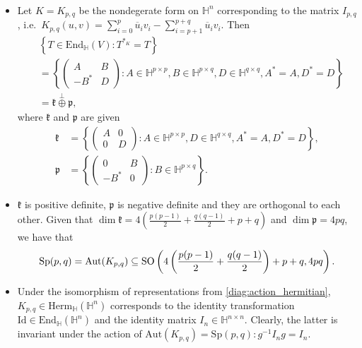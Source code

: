 \documentclass{report}
\begin{document}
\begin{itemize}
\[\begin{tikzcd}
    \end{tikzcd}
    \]
    \item Let $K = K_{p,q}$ be the nondegerate form on $\mathbb H^n$ corresponding to the matrix $I_{p,q}$, i.e.\ $K_{p,q}(u,v) = \sum_{i = 0}^p \overline u_i v_i - \sum_{i = p+1}^{p+q} \overline u_i v_i$.
    Then
    \begin{align*}
        &\left\{ T \in \mathrm{End}_\mathbb H(V) : T^{*_K} = T \right\} \\
        &= \left\{
        \begin{pmatrix}
            A & B \\
            -B^* & D
        \end{pmatrix} : A \in \mathbb H^{p \times p}, B \in \mathbb H^{p \times q}, D \in \mathbb H^{q \times q}, A^* = A, D^* = D
    \right\}\\
    &= \mathfrak k \overset{\perp}{\oplus} \mathfrak p,
    \end{align*}
    where $\mathfrak k$ and $\mathfrak p$ are given 
    \begin{align*}
        \mathfrak k &= \left\{
        \begin{pmatrix}
            A & 0 \\
            0 & D
        \end{pmatrix} : A \in \mathbb H^{p \times p}, D \in \mathbb H^{q \times q}, A^* = A, D^* = D
    \right\},\\
    \mathfrak p &= \left\{
        \begin{pmatrix}
            0 & B \\
            -B^* & 0
        \end{pmatrix} : B \in \mathbb H^{p \times q}
    \right\}.
    \end{align*}
    \item $\mathfrak k$ is positive definite, $\mathfrak p$ is negative definite and they are orthogonal to each other.
    Given that $\dim \mathfrak k = 4\left( \frac{p(p-1)}{2} + \frac{q(q-1)}{2} + p + q \right)$ and $\dim \mathfrak p = 4pq$, we have that
    \[
    \operatorname{{\mathrm{Sp}}}(p,q) = \mathrm{Aut}(K_{p,q}) \subseteq \operatorname{{\mathrm{SO}}}\left(4\left( \frac{p(p-1)}{2} + \frac{q(q-1)}{2} \right)+p+q, 4pq \right).
    \]
    \item Under the isomorphism of representations from \cref{diag:action_hermitian}, $K_{p,q} \in \mathrm{Herm}_\mathbb H(\mathbb H^n)$ corresponds to the identity transformation $\mathrm{Id} \in \mathrm{End}_\mathbb H(\mathbb H^n)$ and the identity matrix $I_n \in \mathbb H^{n \times n}$.
    Clearly, the latter is invariant under the action of $\mathrm{Aut}(K_{p,q}) = \mathrm{Sp}(p,q): g^{-1} I_n g = I_n$.

\end{itemize}
\end{document}
